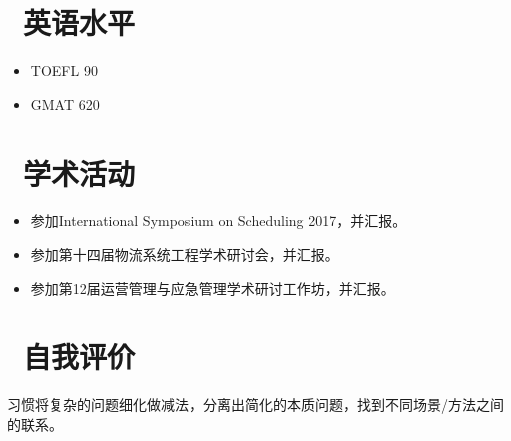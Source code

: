 \documentclass[11pt]{article}
\begin{document}
\section{\makebox[\widthof{\faGraduationCap}][c]{\color{CVBlue}\faLanguage}\ 英语水平}
\begin{itemize}[parsep=0.5ex]
  \item TOEFL 90
  \item GMAT 620
\end{itemize}

\section{\makebox[\widthof{\faGraduationCap}][c]{\color{CVBlue}\faInfo}\ 学术活动}
\begin{itemize}[parsep=0.5ex]
	\item 参加International Symposium on Scheduling 2017，并汇报。
	\item 参加第十四届物流系统工程学术研讨会，并汇报。
	\item 参加第12届运营管理与应急管理学术研讨工作坊，并汇报。
\end{itemize}

\section{\makebox[\widthof{\faGraduationCap}][c]{\color{CVBlue}\faHeart}\ 自我评价}

习惯将复杂的问题细化做减法，分离出简化的本质问题，找到不同场景/方法之间的联系。

\end{document}
